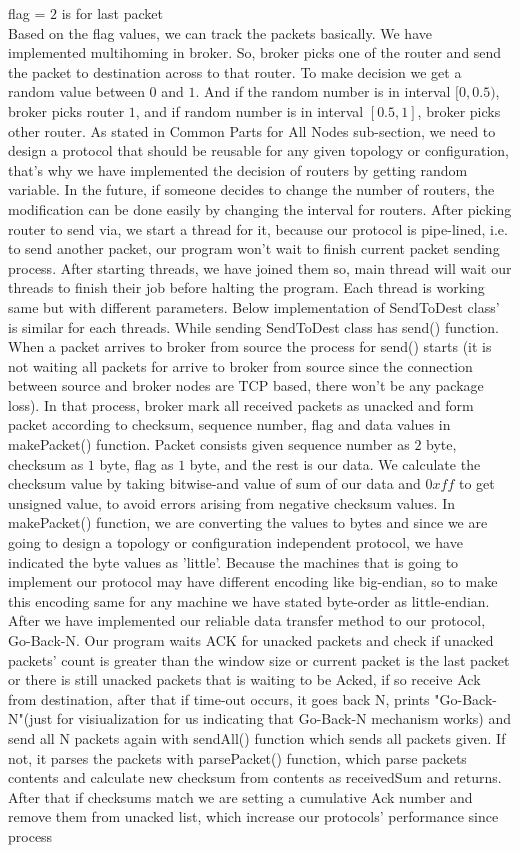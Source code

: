 flag = $2$ is for last packet\\
Based on the flag values, we can track the packets basically. We have implemented multihoming in broker. So, broker picks one of the router and send the packet to destination across to that router. To make decision we get a random value between $0$ and $1$. And if the random number is in interval $[0,0.5)$, broker picks router $1$, and if random number is in interval $[0.5, 1]$, broker picks other router. As stated in Common Parts for All Nodes sub-section, we need to design a protocol that should be reusable for any given topology or configuration, that's why we have implemented the decision of routers by getting random variable. In the future, if someone decides to change the number of routers, the modification can be done easily by changing the interval for routers. After picking router to send via, we start a thread for it, because our protocol is pipe-lined, i.e. to send another packet, our program won't wait to finish current packet sending process. After starting threads, we have joined them so, main thread will wait our threads to finish their job before halting the program. Each thread is working same but with different parameters. Below implementation of SendToDest class' is similar for each threads. While sending SendToDest class has send() function. When a packet arrives to broker from source the process for send() starts (it is not waiting all packets for arrive to broker from source since the connection between source and broker nodes are TCP based, there won't be any package loss). In that process, broker mark all received packets as unacked and form packet according to checksum, sequence number, flag and data values in makePacket() function. Packet consists given sequence number as $2$ byte, checksum as $1$ byte, flag as $1$ byte, and the rest is our data. We calculate the checksum value by taking bitwise-and value of sum of our data and $0xff$ to get unsigned value, to avoid errors  arising from negative checksum values. In makePacket() function, we are converting the values to bytes and since we are going to design a topology or configuration independent protocol, we have indicated the byte values as 'little'. Because the machines that is going to implement our protocol may have different encoding like big-endian, so to make this encoding same for any machine we have stated byte-order as little-endian. After we have implemented our reliable data transfer method to our protocol, Go-Back-N. Our program waits ACK for unacked packets and check if unacked packets' count is greater than the window size or current packet is the last packet or there is still unacked packets that is waiting to be Acked, if so receive Ack from destination, after that if time-out occurs, it goes back N, prints "Go-Back-N"(just for visiualization for us indicating that Go-Back-N mechanism works) and send all N packets again with sendAll() function which sends all packets given. If not, it parses the packets with parsePacket() function, which parse packets contents and calculate new checksum from contents as receivedSum and returns. After that if checksums match we are setting a cumulative Ack number and remove them from unacked list, which increase our protocols' performance since process 